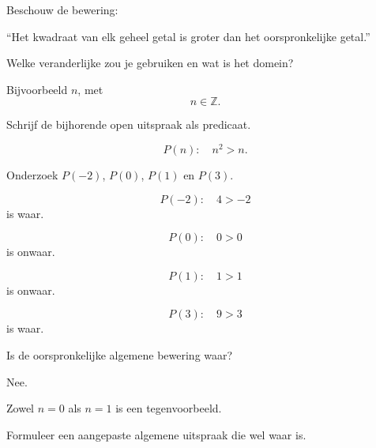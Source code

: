 \documentclass{ximera}
\begin{document}


\begin{oefening}{\oefU \ESS}

Beschouw de bewering:

\begin{center}
``Het kwadraat van elk geheel getal is groter dan het oorspronkelijke
getal.''
\end{center}

\begin{question}
Welke veranderlijke zou je gebruiken en wat is het domein?

\begin{oplossing}
Bijvoorbeeld $n$, met
\[
n\in\mathbb{Z}.
\]
\end{oplossing}
\end{question}


\begin{question}
Schrijf de bijhorende open uitspraak als predicaat.

\begin{oplossing}
\[
P(n):\quad n^2>n.
\]
\end{oplossing}
\end{question}


\begin{question}
Onderzoek $P(-2)$, $P(0)$, $P(1)$ en $P(3)$.

\begin{oplossing}
\[
P(-2):\quad4>-2
\]
is waar.

\[
P(0):\quad0>0
\]
is onwaar.

\[
P(1):\quad1>1
\]
is onwaar.

\[
P(3):\quad9>3
\]
is waar.
\end{oplossing}
\end{question}


\begin{question}
Is de oorspronkelijke algemene bewering waar?

\begin{oplossing}
Nee.

Zowel $n=0$ als $n=1$ is een tegenvoorbeeld.
\end{oplossing}
\end{question}


\begin{question}
Formuleer een aangepaste algemene uitspraak die wel waar is.


\end{question}
\end{oefening}
\end{document}
